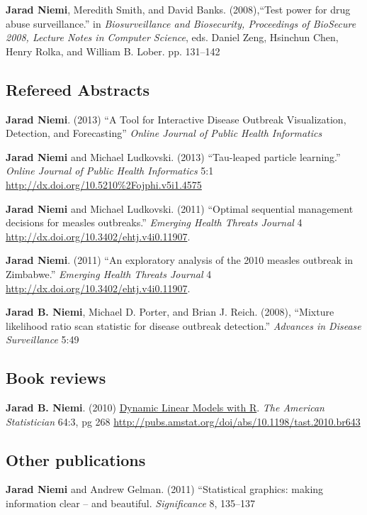 \documentclass[overlapped,line]{res}
\begin{document}
\begin{resume}
{\bf Jarad Niemi}, Meredith Smith, and David Banks. (2008),``Test power for drug abuse surveillance.'' in \emph{Biosurveillance and Biosecurity, Proceedings of BioSecure 2008, Lecture Notes in Computer Science},  eds. Daniel Zeng, Hsinchun Chen, Henry Rolka, and William B. Lober. pp. 131--142

\subsection{\bf Refereed Abstracts}

{\bf Jarad Niemi}. (2013) ``A Tool for Interactive Disease Outbreak Visualization, Detection, and Forecasting'' \emph{Online Journal of Public Health Informatics}

{\bf Jarad Niemi} and Michael Ludkovski. (2013) ``Tau-leaped particle learning.'' \emph{Online Journal of Public Health Informatics} 5:1 \url{http://dx.doi.org/10.5210%2Fojphi.v5i1.4575}

{\bf Jarad Niemi} and Michael Ludkovski. (2011) ``Optimal sequential management decisions for measles outbreaks.'' \emph{Emerging Health Threats Journal} 4 \url{http://dx.doi.org/10.3402/ehtj.v4i0.11907}.

{\bf Jarad Niemi}. (2011) ``An exploratory analysis of the 2010 measles outbreak in Zimbabwe.'' \emph{Emerging Health Threats Journal} 4 \url{http://dx.doi.org/10.3402/ehtj.v4i0.11907}.


{\bf Jarad B. Niemi}, Michael D. Porter, and Brian J. Reich. (2008), ``Mixture likelihood ratio scan statistic for disease outbreak detection.'' \emph{Advances in Disease Surveillance} 5:49



\subsection{\bf Book reviews}

{\bf Jarad B. Niemi}. (2010) \underline{Dynamic Linear Models with R}. \emph{The American Statistician} 64:3, pg 268 \url{http://pubs.amstat.org/doi/abs/10.1198/tast.2010.br643}


\subsection{\bf Other publications}

{\bf Jarad Niemi } and Andrew Gelman. (2011) ``Statistical graphics: making information clear -- and beautiful. \emph{Significance} 8, 135--137


\end{resume}
\end{document}
